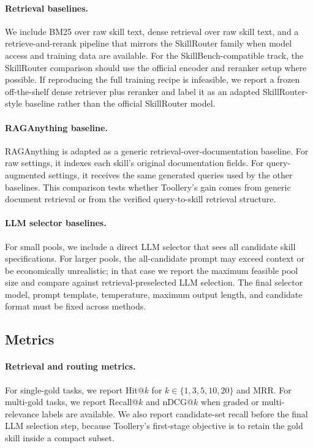 \documentclass[11pt]{article}
\begin{document}
\paragraph{Retrieval baselines.}
We include BM25 over raw skill text, dense retrieval over raw skill text, and a
retrieve-and-rerank pipeline that mirrors the SkillRouter family when model
access and training data are available. For the SkillBench-compatible track, the
SkillRouter comparison should use the official encoder and reranker setup where
possible. If reproducing the full training recipe is infeasible, we report a
frozen off-the-shelf dense retriever plus reranker and label it as an adapted
SkillRouter-style baseline rather than the official SkillRouter model.

\paragraph{RAGAnything baseline.}
RAGAnything is adapted as a generic retrieval-over-documentation baseline. For
raw settings, it indexes each skill's original documentation fields. For
query-augmented settings, it receives the same generated queries used by the
other baselines. This comparison tests whether Toollery's gain comes from
generic document retrieval or from the verified query-to-skill retrieval
structure.

\paragraph{LLM selector baselines.}
For small pools, we include a direct LLM selector that sees all candidate skill
specifications. For larger pools, the all-candidate prompt may exceed context or
be economically unrealistic; in that case we report the maximum feasible pool
size and compare against retrieval-preselected LLM selection. The final selector
model, prompt template, temperature, maximum output length, and candidate format
must be fixed across methods.

\subsection{Metrics}
\label{subsec:metrics}

\paragraph{Retrieval and routing metrics.}
For single-gold tasks, we report Hit@$k$ for $k \in \{1, 3, 5, 10, 20\}$ and
MRR. For multi-gold tasks, we report Recall@$k$ and nDCG@$k$ when graded or
multi-relevance labels are available. We also report candidate-set recall before
the final LLM selection step, because Toollery's first-stage objective is to
retain the gold skill inside a compact subset.
\end{document}

